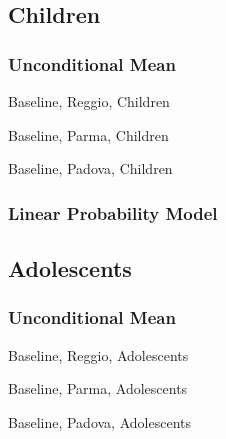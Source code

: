\documentclass[12pt]{article}
\begin{document}
\subsection{Children}
\subsubsection{Unconditional Mean}
\begin{table}[H]
\caption{Baseline, Reggio, Children}
\scalebox{0.85}{

}
\end{table}

\begin{table}[H]
\caption{Baseline, Parma, Children}
\scalebox{0.85}{

}
\end{table}

\begin{table}[H]
\caption{Baseline, Padova, Children}
\scalebox{0.85}{

}
\end{table}

\subsubsection{Linear Probability Model}






\subsection{Adolescents}
\subsubsection{Unconditional Mean}
\begin{table}[H]
\caption{Baseline, Reggio, Adolescents}
\scalebox{0.85}{

}
\end{table}

\begin{table}[H]
\caption{Baseline, Parma, Adolescents}
\scalebox{0.85}{

}
\end{table}

\begin{table}[H]
\caption{Baseline, Padova, Adolescents}
\scalebox{0.85}{

}
\end{table}
\end{document}
